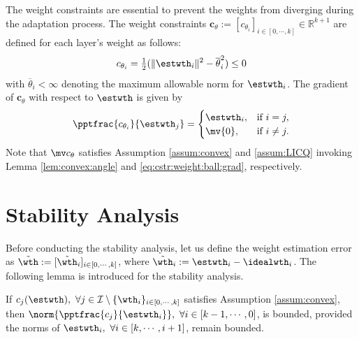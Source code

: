 \documentclass[final,5p,times,twocolumn,authoryear]{elsarticle}
\begin{document}
The weight constraints are essential to prevent the weights from diverging during the adaptation process.
The weight constraints $\boldsymbol{c}_{\theta}:= [c_{\theta_i}]_{i\in[0,\cdots ,k]}\in\mathbb R^{k+1}$ are defined for each layer's weight as follows:
\begin{equation}
    c_{\theta_i}
    =
    \tfrac{1}{2}
    (
        \Vert \estwth_i\Vert^2 
        -
        \overline\theta_i^2 
    )    
    \le 0
    \label{eq:cstr:weight:ball}
\end{equation}
with $\overline\theta_i<\infty$ denoting the maximum allowable norm for $\estwth_i$. 
The gradient of $\boldsymbol{c}_\theta$ with respect to $\estwth$ is given by
\begin{equation}
    \pptfrac{c_{\theta_i}}{\estwth_j} 
    =
    \begin{cases}
        \estwth_i,
        &
        \text{if } i=j,
        \\
        \mv{0},
        &
        \text{if } i\ne j
        .
    \end{cases} 
    \label{eq:cstr:weight:ball:grad}
\end{equation}
Note that $\mv c_{\theta}$ satisfies Assumption \ref{assum:convex} and \ref{assum:LICQ} invoking Lemma \ref{lem:convex:angle} and \eqref{eq:cstr:weight:ball:grad}, respectively.

\section{Stability Analysis}\label{sec:stability}

Before conducting the stability analysis, let us define the weight estimation error as $\tilde\wth:= [\tilde\wth_i]_{i\in[0,\cdots,k]}$, where $\tilde\wth_i:=\estwth_i-\idealwth_i$.
The following lemma is introduced for the stability analysis.

\begin{lem} 
    If $c_j(\estwth),\ \forall j\in\mathcal I \setminus \{\wth_i\}_{i\in[0,\cdots,k]}$ satisfies Assumption \ref{assum:convex}, then $\norm{\pptfrac{c_j}{\estwth_i}},\ \forall i\in[k-1,\cdots, 0]$, is bounded, provided the norms of $\estwth_i,\ \forall i\in[k,\cdots, i+1]$, remain bounded.
    \label{lem:cstr:grad:bound}
\end{lem}
\end{document}
